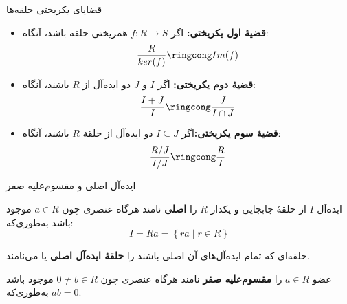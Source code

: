 \begin{frame}[t]{قضایای یکریختی حلقه‌ها}
    \begin{theorem}
        \leavevmode
        \begin{itemize}
            \item \textbf{قضیهٔ اول یکریختی:} اگر $f \colon R \to S$ همریختی حلقه باشد، آنگاه:
                  \[
                      \frac{R}{ker(f)} \ringcong Im(f)
                  \]

            \item \textbf{قضیهٔ دوم یکریختی:}
                  اگر $I $ و $J$ دو ایده‌آل از $R$ باشند، آنگاه:
                  \[
                      \frac{I + J}{I} \ringcong \frac{J}{I \cap J}
                  \]
            \item \textbf{قضیهٔ سوم یکریختی:}اگر $I \subseteq J$ دو ایده‌آل از حلقهٔ $R$ باشند، آنگاه:
                  \[
                      \frac{R/J}{I/J} \ringcong \frac{R}{I}
                  \]
        \end{itemize}


    \end{theorem}


\end{frame}


\begin{frame}[t]{ایده‌آل اصلی و مقسوم‌علیه صفر}
    \begin{definition}
        ایده‌آل $I$  از حلقهٔ جابجایی و یکدار $R$ را \textbf{اصلی} نامند هرگاه عنصری چون $a \in R$ موجود باشد به‌طوری‌که:
        \[
            I = Ra = \left\{ ra \mid r \in R \right\}
        \]
    \end{definition}

    \begin{definition}
        حلقه‌ای که تمام ایده‌آل‌های آن اصلی باشند را \textbf{حلقهٔ ایده‌آل اصلی} یا   می‌نامند.
    \end{definition}

    \begin{definition}
        عضو $a \in R$ را \textbf{مقسوم‌علیه صفر} نامند هرگاه عنصری چون $0 \neq b \in R$ موجود باشد به‌طوری‌که \(ab = 0 \).

    \end{definition}

\end{frame}

